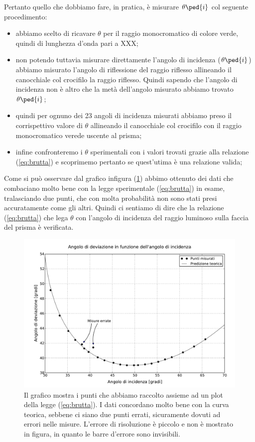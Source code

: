 Pertanto quello che dobbiamo fare, in pratica, è misurare $\theta\ped{i}$ col seguente procedimento:

\begin{itemize}
	\item{abbiamo scelto di ricavare $\theta$ per il raggio monocromatico di colore verde, quindi di lunghezza d'onda pari a XXX;}
	\item{non potendo tuttavia misurare direttamente l'angolo di incidenza ($\theta\ped{i}$) abbiamo misurato l'angolo di riflessione del raggio riflesso allineando il canocchiale col crocifilo la raggio riflesso. Quindi sapendo che l'angolo di incidenza non è altro che la metà dell'angolo misurato abbiamo trovato $\theta\ped{i}$;}
	\item{quindi per ognuno dei 23 angoli di incidenza misurati abbiamo preso il corrispettivo valore di $\theta$ allineando il canocchiale col crocifilo con il raggio monocromatico verede uscente al prisma;}
	\item{infine confronteremo i $\theta$ sperimentali con i valori trovati grazie alla relazione (\ref{eq:brutta}) e scoprimemo pertanto se quest'utima è una relazione valida;}
\end{itemize}

Come si può osservare dal grafico infigura (\ref{fig:dev}) abbimo ottenuto dei dati che combaciano molto bene con la legge sperimentale (\ref{eq:brutta}) in esame, tralasciando due punti, che con molta probabilità non sono stati presi accuratamente come gli altri. Quindi ci sentiamo di dire che la relazione (\ref{eq:brutta}) che lega $\theta$ con l'angolo di incidenza del raggio luminoso sulla faccia del prisma è verificata.

\begin{figure}[b]
    \includegraphics[width=16cm]{graph.pdf}
    \caption{Il grafico mostra i punti che abbiamo raccolto assieme ad un plot della legge (\ref{eq:brutta}). I dati concordano
    molto bene con la curva teorica, sebbene ci siano due punti errati, sicuramente dovuti ad errori nelle misure. L'errore di
    risoluzione è piccolo e non è mostrato in figura, in quanto le barre d'errore sono invisibili.}
    \label{fig:dev}
\end{figure}


